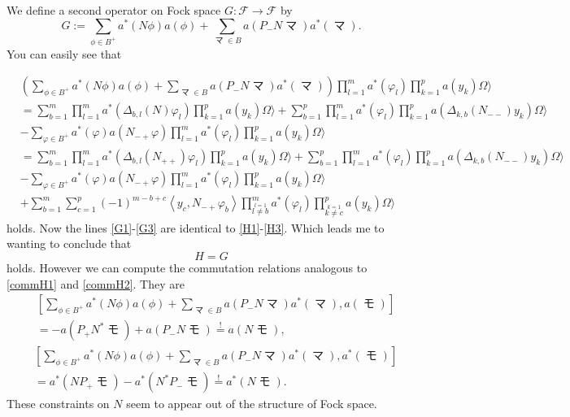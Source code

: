 \documentclass[oneside,reqno,12pt]{amsart}
\DeclareMathOperator{\ma}{マ}
\DeclareMathOperator{\mo}{モ}
\begin{document}
We define a second operator on Fock space \(G: \mathcal{F}\rightarrow \mathcal{F}\) by
\begin{equation}
G:= \sum_{\phi\in B^+} a^*\left( N\phi\right)a(\phi) + \sum_{\ma\in B} a\left( P_- N\ma\right) a^*(\ma ).
\end{equation}
You can easily see that

\begin{align*}
&\left( \sum_{\phi\in B^+} a^*\left( N\phi\right)a(\phi) + \sum_{\ma\in B} a\left( P_- N\ma\right) a^*(\ma )\right) \prod_{l=1}^m a^*(\varphi_l) \prod_{k=1}^p a(y_k) \Omega \rangle\\
&=\sum_{b=1}^m \prod_{l=1}^m a^*\left( \Delta_{b,l}\left(N\right)\varphi_l\right)\prod_{k=1}^p a(y_k) \Omega \rangle + \sum_{b=1}^p \prod_{l=1}^m a^*(\varphi_l)\prod_{k=1}^p a\left( \Delta_{k,b}\left(N_{--}\right)y_k\right) \Omega\rangle\\
&-\sum_{\varphi\in B^+} a^*(\varphi) a\left( N_{-+}\varphi\right) \prod_{l=1}^m a^*(\varphi_l) \prod_{k=1}^p a(y_k) \Omega \rangle\\\tag{G1}\label{G1}
&=\sum_{b=1}^m \prod_{l=1}^m a^*\left( \Delta_{b,l}\left(N_{++}\right)\varphi_l\right)\prod_{k=1}^p a(y_k) \Omega \rangle + \sum_{b=1}^p \prod_{l=1}^m a^*(\varphi_l)\prod_{k=1}^p a\left( \Delta_{k,b}\left(N_{--}\right)y_k\right) \Omega\rangle\\\tag{G2}\label{G2}
&-\sum_{\varphi\in B^+} a^*(\varphi) a\left( N_{-+}\varphi\right) \prod_{l=1}^m a^*(\varphi_l) \prod_{k=1}^p a(y_k) \Omega \rangle\\\tag{G3}\label{G3}
&+\sum_{b=1}^m \sum_{c=1}^p (-1)^{m-b+c} \left< y_c, N_{-+}\varphi_b\right> \prod_{\stackrel{l=1}{l\neq b}}^m a^*(\varphi_l) \prod_{\stackrel{k=1}{k\neq c}}^p a(y_k) \Omega \rangle
\end{align*}
holds. Now the lines \eqref{G1}-\eqref{G3} are identical to \eqref{H1}-\eqref{H3}.  Which leads me to wanting to conclude that 
\begin{equation}
H= G
\end{equation}
holds. However we can compute the commutation relations analogous to \eqref{commH1} and \eqref{commH2}. They are
\begin{align*}
&\left[  \sum_{\phi\in B^+} a^*\left( N\phi\right)a(\phi) + \sum_{\ma\in B} a\left( P_- N\ma\right) a^*(\ma ), a(\mo) \right]\\
&=-a\left(P_+N^* \mo \right) +a\left( P_- N\mo\right)\stackrel{!}{=} a\left( N\mo\right)
,\end{align*}
\begin{align*}
&\left[  \sum_{\phi\in B^+} a^*\left( N\phi\right)a(\phi) + \sum_{\ma\in B} a\left( P_- N\ma\right) a^*(\ma ), a^*(\mo) \right]\\
&=a^*\left(N P_+\mo \right) -a^*\left(  N^*P_-\mo\right)\stackrel{!}{=} a^*\left( N\mo\right)
.\end{align*}
These constraints on \(N\) seem to appear out of the structure of Fock space.
\end{document}
